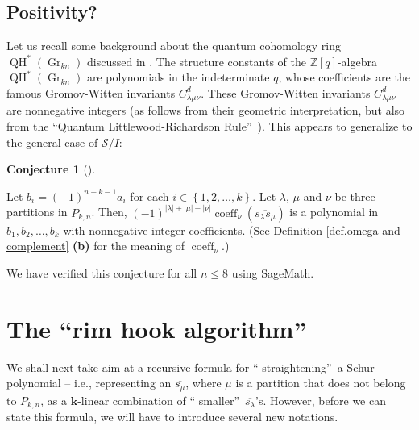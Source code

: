 \documentclass[numbers=enddot,12pt,final,onecolumn,notitlepage]{scrartcl}%
\theoremstyle{definition}
\newtheorem{conj}[theo]{Conjecture}
\newenvironment{conjecture}[1][]
{\begin{conj}[#1]\begin{leftbar}}
{\end{leftbar}\end{conj}}
\begin{document}
\subsection{Positivity?}

Let us recall some background about the quantum cohomology ring
$\operatorname*{QH}\nolimits^{\ast}\left(  \operatorname*{Gr}\nolimits_{kn}%
\right)  $ discussed in \cite{Postni05}. The structure constants of the
$\mathbb{Z}\left[  q\right]  $-algebra $\operatorname*{QH}\nolimits^{\ast
}\left(  \operatorname*{Gr}\nolimits_{kn}\right)  $ are polynomials in the
indeterminate $q$, whose coefficients are the famous Gromov-Witten invariants
$C_{\lambda\mu\nu}^{d}$. These Gromov-Witten invariants $C_{\lambda\mu\nu}%
^{d}$ are nonnegative integers (as follows from their geometric
interpretation, but also from the \textquotedblleft Quantum
Littlewood-Richardson Rule\textquotedblright\ \cite[Theorem 2]{BKPT16}). This
appears to generalize to the general case of $\mathcal{S}/I$:

\begin{conjecture}
Let $b_{i}=\left(  -1\right)  ^{n-k-1}a_{i}$ for each $i\in\left\{
1,2,\ldots,k\right\}  $. Let $\lambda$, $\mu$ and $\nu$ be three partitions in
$P_{k,n}$. Then, $\left(  -1\right)  ^{\left\vert \lambda\right\vert
+\left\vert \mu\right\vert -\left\vert \nu\right\vert }\operatorname*{coeff}%
\nolimits_{\nu}\left(  \overline{s_{\lambda}s_{\mu}}\right)  $ is a polynomial
in $b_{1},b_{2},\ldots,b_{k}$ with nonnegative integer coefficients. (See
Definition \ref{def.omega-and-complement} \textbf{(b)} for the meaning of
$\operatorname*{coeff}\nolimits_{\nu}$.)
\end{conjecture}

We have verified this conjecture for all $n\leq8$ using SageMath.

\section{The \textquotedblleft rim hook algorithm\textquotedblright}

We shall next take aim at a recursive formula for \textquotedblleft
straightening\textquotedblright\ a Schur polynomial -- i.e., representing an
$\overline{s_{\mu}}$, where $\mu$ is a partition that does not belong to
$P_{k,n}$, as a $\mathbf{k}$-linear combination of \textquotedblleft
smaller\textquotedblright\ $\overline{s_{\lambda}}$'s. However, before we can
state this formula, we will have to introduce several new notations.
\end{document}
